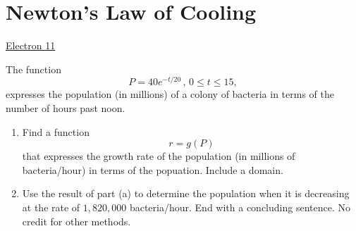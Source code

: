 \documentclass{ximera}
\begin{document}
\section{Newton's Law of Cooling}



\begin{exploration} \label{Edgvb5rthh}

\begin{onlineOnly}
    \begin{center}
\end{center}
\end{onlineOnly}

\href{https://www.desmos.com/calculator/yebumxuwms}{Electron 11}


\end{exploration}

\begin{question}  \label{Qhvvbrmb4}
 The function
\[
    P = 40 e^{-t/20} \, , \, 0\leq t \leq 15 ,
\]
expresses the population (in millions) of a colony of bacteria in terms of the number of hours past noon.

\begin{enumerate}
\item Find a function
\[
       r = g(P)
\]
that expresses the growth rate of the population (in millions of bacteria/hour) in terms of the popuation. Include a domain.

\item Use the result of part (a) to determine the population when it is decreasing at the rate of $1,820,000$ bacteria/hour. End with a concluding sentence. No credit for other methods.
   


\end{enumerate}


\end{question}
\end{document}
